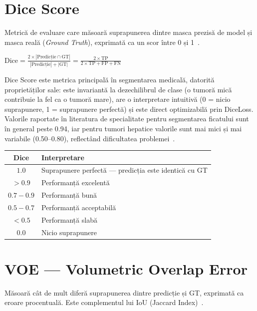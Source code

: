 \documentclass[12pt, a4paper]{report}
\newcommand{\formula}[1]{%
    \begin{center}
        \colorbox{codebackground}{%
            \parbox{0.88\textwidth}{\centering\vspace{4pt}$#1$\vspace{4pt}}%
        }
    \end{center}
}
\begin{document}
\section{Dice Score}

\vspace{4pt}
\begin{infobox}
Metrică de evaluare care măsoară suprapunerea dintre masca prezisă de model
și masca reală (\textit{Ground Truth}), exprimată ca un scor între 0 și 1~\cite{bilic2023lits}.
\end{infobox}

\formula{
    \text{Dice} = \frac{2 \times |\text{Predicție} \cap \text{GT}|}{|\text{Predicție}| + |\text{GT}|}
    = \frac{2 \times \text{TP}}{2 \times \text{TP} + \text{FP} + \text{FN}}
}

Dice Score este metrica principală în segmentarea medicală, datorită proprietăților sale:
este invariantă la dezechilibrul de clase (o tumoră mică contribuie la fel ca o tumoră mare),
are o interpretare intuitivă (0 = nicio suprapunere, 1 = suprapunere perfectă) și este direct
optimizabilă prin DiceLoss. Valorile raportate în literatura de specialitate pentru segmentarea
ficatului sunt în general peste 0.94, iar pentru tumori hepatice valorile sunt mai mici
și mai variabile (0.50–0.80), reflectând dificultatea problemei~\cite{bilic2023lits}.

\begin{center}
\begin{tabular}{cl}
    \toprule
    \textbf{Dice} & \textbf{Interpretare} \\
    \midrule
    $1.0$ & Suprapunere perfectă — predicția este identică cu GT \\
    $> 0.9$ & Performanță excelentă \\
    $0.7 - 0.9$ & Performanță bună \\
    $0.5 - 0.7$ & Performanță acceptabilă \\
    $< 0.5$ & Performanță slabă \\
    $0.0$ & Nicio suprapunere \\
    \bottomrule
\end{tabular}
\end{center}

\section{VOE — Volumetric Overlap Error}

\vspace{4pt}
\begin{infobox}
Măsoară cât de mult diferă suprapunerea dintre predicție și GT,
exprimată ca eroare procentuală. Este complementul lui IoU (Jaccard Index)~\cite{bilic2023lits}.
\end{infobox}
\end{document}
